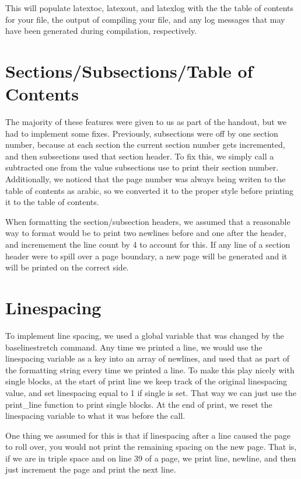 This will populate latextoc, latexout, and latexlog with the the table of contents for your file, the output of compiling your file, and any log messages that may have been generated during compilation, respectively.

\section{Sections/Subsections/Table of Contents}

The majority of these features were given to us as part of the handout, but we had to implement some fixes. Previously, subsections were off by one section number, because at each section the current section number gets incremented, and then subsections used that section header. To fix this, we simply call a subtracted one from the value subsections use to print their section number. Additionally, we noticed that the page number was always being writen to the table of contents as arabic, so we converted it to the proper style before printing it to the table of contents. 

When formatting the section/subsection headers, we assumed that a reasonable way to format would be to print two newlines before and one after the header, and incremement the line count by 4 to account for this. If any line of a section header were to spill over a page boundary, a new page will be generated and it will be printed on the correct side.

\section{Linespacing}

To implement line spacing, we used a global variable that was changed by the baselinestretch command. Any time we printed a line, we would use the linespacing variable as a key into an array of newlines, and used that as part of the formatting string every time we printed a line. To make this play nicely with single blocks, at the start of print line we keep track of the original linespacing value, and set linespacing equal to 1 if single is set. That way we can just use the print\_line function to print single blocks. At the end of print, we reset the linespacing variable to what it was before the call.

One thing we assumed for this is that if linespacing after a line caused the page to roll over, you would not print the remaining spacing on the new page. That is, if we are in triple space and on line 39 of a page, we print line, newline, and then just increment the page and print the next line. 

